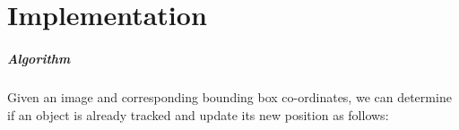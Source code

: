 \chapter{Implementation}

\paragraph{Algorithm} Given an image and corresponding bounding box co-ordinates, we can determine if an object is already tracked and update its new position as follows:

\begin{algorithm}[ht] %
\end{algorithm}